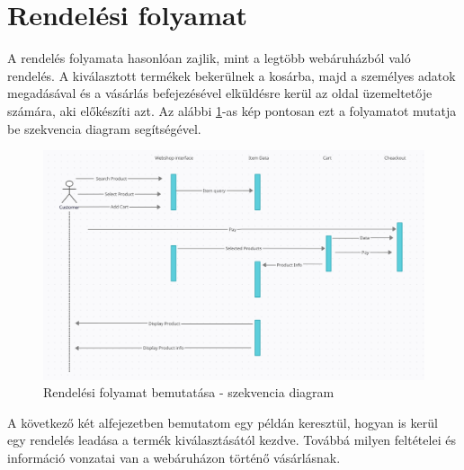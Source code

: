\section{Rendelési folyamat}
A rendelés folyamata hasonlóan zajlik, mint a legtöbb webáruházból való rendelés. A kiválasztott termékek bekerülnek a kosárba, majd a személyes adatok megadásával és a vásárlás befejezésével elküldésre kerül az oldal üzemeltetője számára, aki előkészíti azt. Az alábbi \ref{fig.exemple-8}-as kép pontosan ezt a folyamatot mutatja be szekvencia diagram segítségével.
\begin{figure}[H]
	\centering
	\includegraphics[width=1.0\textwidth]{images/szekvencia_diagram.PNG}
	\caption{Rendelési folyamat bemutatása - szekvencia diagram}
	\label{fig.exemple-8}
\end{figure}

A következő két alfejezetben bemutatom egy példán keresztül, hogyan is kerül egy rendelés leadása a termék kiválasztásától kezdve. Továbbá milyen feltételei és információ vonzatai van a webáruházon történő vásárlásnak.

